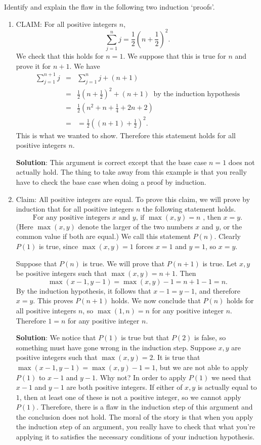 \documentclass[11pt]{article}
\begin{document}
\begin{enumerate}
Identify and explain the flaw in the following two induction `proofs'.
\begin{enumerate}
\item CLAIM: For all positive integers $n$,
\[ 
\sum_{j=1}^n j = \frac{1}{2} \left(n+\frac{1}{2}\right)^2.
\]
We check that this holds for $n=1$.  We suppose that this is true for $n$ and prove it for $n+1$.  We have
\begin{eqnarray*} 
\sum_{j=1}^{n+1} j & = &  \sum_{j=1}^n j + (n+1) \\
& = & \frac{1}{2} \left(n+\frac{1}{2}\right)^2 + (n+1)\ \text{ by the induction hypothesis} \\
& = & \frac{1}{2}\left(n^2 + n +\frac{1}{4} + 2n+2\right) \\
& = & = \frac{1}{2} \left( (n+1) + \frac{1}{2} \right)^2.
\end{eqnarray*}
This is what we wanted to show.  Therefore this statement holds for all positive integers $n$.

{\bf Solution}: This argument is correct except that the base case $n=1$ does not actually hold.  The thing to take away from this example is that you really have to check the base case when doing a proof by induction.

\item Claim: All positive integers are equal.  To prove this claim, we will prove by induction that for all positive integers $n$ the following statement holds.
\[
\text{For any positive integers } x \text{ and } y \text{, if } \max(x,y) = n \text{ , then } x=y.
\]
(Here $\max(x,y)$ denote the larger of the two numbers $x$ and $y$, or the common value if both are equal.)  We call this statement $P(n)$.  Clearly $P(1)$ is true, since $\max(x,y) = 1$ forces $x=1$ and $y=1$, so $x=y$.

Suppose that $P(n)$ is true.  We will prove that $P(n+1)$ is true.  Let $x,y$ be positive integers such that $\max(x,y) = n+1$.  Then 
\[
\max(x-1,y-1) = \max(x,y) -1 = n+1-1 = n.
\]
By the induction hypothesis, it follows that $x-1 = y-1$, and therefore $x=y$.  This proves $P(n+1)$ holds.  We now conclude that $P(n)$ holds for all positive integers $n$, so $\max(1,n) = n$ for any positive integer $n$. Therefore $1=n$ for any positive integer $n$.

{\bf Solution}: We notice that $P(1)$ is true but that $P(2)$ is false, so something must have gone wrong in the induction step.  Suppose $x,y$ are positive integers such that $\max(x,y) = 2$.  It is true that $\max(x-1,y-1) = \max(x,y) - 1 = 1$, but we are not able to apply $P(1)$ to $x-1$ and $y-1$.  Why not?  In order to apply $P(1)$ we need that $x-1$ and $y-1$ are both positive integers.  If either of $x,y$ is actually equal to $1$, then at least one of these is not a positive integer, so we cannot apply $P(1)$.  Therefore, there is a flaw in the induction step of this argument and the conclusion does not hold.  The moral of the story is that when you apply the induction step of an argument, you really have to check that what you're applying it to satisfies the necessary conditions of your induction hypothesis.




\end{enumerate}
\end{enumerate}
\end{document}
